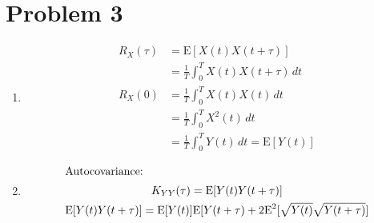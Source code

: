 \documentclass[a4paper, twoside, fleqn]{scrartcl}
\newcommand{\E}[0]{\ensuremath{\text{E}}} %
\begin{document}
\section*{Problem 3}
  \label{3}
  \begin{enumerate}
    \item 
      \label{3a}
      \begin{align}
        R_X(\tau) &= \E \left[ X(t) X(t+\tau) \right] \\
        &= \frac 1 T \int_0^T X(t) X(t+\tau) \, dt \\
        R_X(0) &= \frac 1 T \int_0^T X(t) X(t) \, dt \\
        &= \frac 1 T \int_0^T X^2(t) \, dt \\
        &= \frac 1 T \int_0^T Y(t) \, dt = \E[Y(t)]
      \end{align}
      
    \item
      \label{3b}
      \begin{gather}
        \intertext{Autocovariance:}
        K_{YY}(\tau) = \E[Y(t) Y(t+\tau)] \\
        \E[Y(t) Y(t+\tau)] = \E[Y(t)] \E[Y(t+\tau) + 2 \E^2[\sqrt{Y(t)} \sqrt{Y(t+\tau)}]
      \end{gather}

  \end{enumerate}
\end{document}
